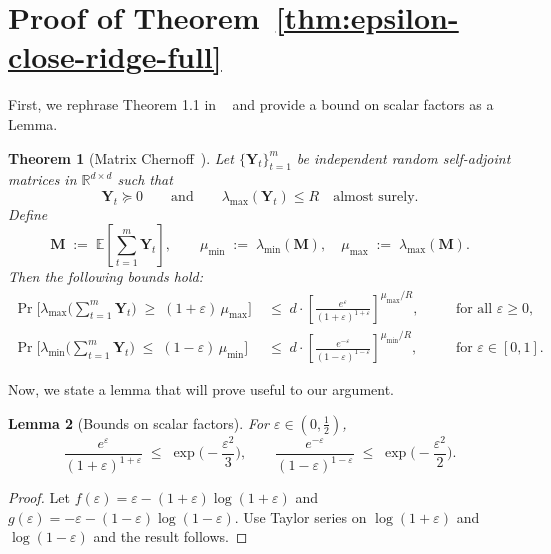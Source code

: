 \documentclass{article}
\newtheorem{theorem}{Theorem}
\newtheorem{lemma}[theorem]{Lemma}
\newcommand{\1}{\mathbbm{1}}
\begin{document}
\section{Proof of Theorem~\eqref{thm:epsilon-close-ridge-full}}

First, we rephrase Theorem 1.1 in ~\cite{tropp2012user} and provide a bound on scalar factors as a Lemma.

\begin{theorem}[Matrix Chernoff~\cite{tropp2012user}]
\label{thm:matrix-chernoff}
Let $\{\mathbf{Y}_t\}_{t=1}^m$ be independent random self-adjoint matrices in $\mathbb{R}^{d\times d}$
such that
\[
\mathbf{Y}_t \succeq 0
\qquad\text{and}\qquad
\lambda_{\max}(\mathbf{Y}_t)\le R
\quad\text{almost surely.}
\]
Define
\[
\mathbf{M} \;:=\; \mathbb{E}\!\left[\sum_{t=1}^m \mathbf{Y}_t\right],
\qquad
\mu_{\min} \;:=\; \lambda_{\min}(\mathbf{M}),\quad
\mu_{\max} \;:=\; \lambda_{\max}(\mathbf{M}).
\]
Then the following bounds hold:
\begin{align*}
\Pr\!\Big[\lambda_{\max}\!\Big(\sum_{t=1}^m \mathbf{Y}_t\Big)
  \;\ge\; (1+\varepsilon)\,\mu_{\max}\Big]
&\;\le\;
d\cdot
\left[\frac{e^{\varepsilon}}{(1+\varepsilon)^{1+\varepsilon}}\right]^{\mu_{\max}/R},
\quad &&\text{for all }\varepsilon\ge 0,\\[3mm]
\Pr\!\Big[\lambda_{\min}\!\Big(\sum_{t=1}^m \mathbf{Y}_t\Big)
  \;\le\; (1-\varepsilon)\,\mu_{\min}\Big]
&\;\le\;
d\cdot
\left[\frac{e^{-\varepsilon}}{(1-\varepsilon)^{1-\varepsilon}}\right]^{\mu_{\min}/R},
\quad &&\text{for }\varepsilon\in[0,1].
\end{align*}
\end{theorem}

Now, we state a lemma that will prove useful to our argument.

\begin{lemma}[Bounds on scalar factors]\label{lem:scalar-factors}
For $\varepsilon\in(0,\tfrac12)$,
\[
\frac{e^{\varepsilon}}{(1+\varepsilon)^{1+\varepsilon}} \;\le\; \exp\!\Big(-\frac{\varepsilon^2}{3}\Big),
\qquad
\frac{e^{-\varepsilon}}{(1-\varepsilon)^{1-\varepsilon}} \;\le\; \exp\!\Big(-\frac{\varepsilon^2}{2}\Big).
\]
\end{lemma}

\begin{proof}
Let $f(\varepsilon)=\varepsilon-(1+\varepsilon)\log(1+\varepsilon)$ and $g(\varepsilon)=-\varepsilon-(1-\varepsilon)\log(1-\varepsilon)$.
%
Use Taylor series on $\log(1+\varepsilon)$ and $\log(1-\varepsilon)$ and the result follows.
\end{proof}
\end{document}
